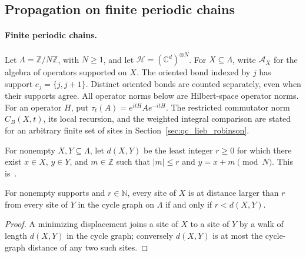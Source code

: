 \subsection{Propagation on finite periodic chains}


\paragraph{Finite periodic chains.}
Let $\Lambda=\mathbb Z/N\mathbb Z$, with $N\geq1$, and let
$\mathcal H=(\mathbb C^d)^{\otimes N}$. For $X\subseteq\Lambda$, write
$\mathcal A_X$ for the algebra of operators supported on $X$. The oriented
bond indexed by $j$ has support $e_j=\{j,j+1\}$. Distinct oriented bonds
are counted separately, even when their supports agree. All operator norms
below are Hilbert-space operator norms. For an operator $H$, put
$\tau_t(A)=e^{itH}Ae^{-itH}$. The restricted commutator norm $C_B(X,t)$, its
local recursion, and the weighted integral comparison are stated for an
arbitrary finite set of sites in Section~\ref{sec:qc_lieb_robinson}.

\begin{definition}
    \label{aux:ring-support-distance}
    \leanok
    For nonempty $X,Y\subseteq\Lambda$, let $d(X,Y)$ be the least integer $r\geq0$
    for which there exist $x\in X$, $y\in Y$, and $m\in\mathbb Z$ such that
    $|m|\leq r$ and $y=x+m\pmod N$.
    This is~\cite[``Distance on the ring'']{QICLean2026Blueprint}.
\end{definition}

\begin{lemma}
    \label{aux:ring-support-distance-separation}
    \leanok
    For nonempty supports and $r\in\mathbb N$, every site of $X$ is at distance
    larger than $r$ from every site of $Y$ in the cycle graph on $\Lambda$ if and
    only if $r<d(X,Y)$.
\end{lemma}
\begin{proof}\leanok
    A minimizing displacement joins a site of $X$ to a site of $Y$ by a walk of
    length $d(X,Y)$ in the cycle graph; conversely $d(X,Y)$ is at most the
    cycle-graph distance of any two such sites.
\end{proof}

